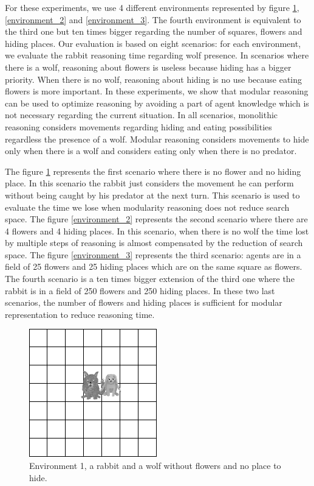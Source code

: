 \documentclass{aamas2012}
\begin{document}
	For these experiments, we use 4 different environments represented by figure \ref{environment_1}, \ref{environment_2} and \ref{environment_3}.
	The fourth environment is equivalent to the third one but ten times bigger regarding the number of squares, flowers and hiding places.
	Our evaluation is based on eight scenarios: for each environment, we evaluate the rabbit reasoning time regarding wolf presence.
	In scenarios where there is a wolf, reasoning about flowers is useless because hiding has a bigger priority.
	When there is no wolf, reasoning about hiding is no use because eating flowers is more important.
	In these experiments, we show that modular reasoning can be used to optimize reasoning by avoiding a part of agent knowledge which 
	is not necessary regarding the current situation.
	In all scenarios, monolithic reasoning considers movements regarding hiding and eating possibilities regardless the presence of a wolf.
	Modular reasoning considers movements to hide only when there is a wolf and considers eating only when there is no predator.
	
	The figure \ref{environment_1} represents the first scenario where there is no flower and no hiding place.
	In this scenario the rabbit just considers the movement he can perform without being caught by his predator at the next turn.
	This scenario is used to evaluate the time we lose when modularity reasoning does not reduce search space.
	The figure \ref{environment_2} represents the second scenario where there are 4 flowers and 4 hiding places.
	In this scenario, when there is no wolf the time lost by multiple steps of reasoning is almost compensated by the reduction of search space.
	The figure \ref{environment_3} represents the third scenario: agents are in a field of 25 flowers and 25 hiding places which are on the same square as flowers.
	The fourth scenario is a ten times bigger extension of the third one where the rabbit is in a field of 250 flowers and 250 hiding places. 
	In these two last scenarios, the number of flowers and hiding places is sufficient for modular representation to reduce reasoning time.
	
	\begin{figure}
		\centering
		\includegraphics[keepaspectratio=true, scale=0.5]{environment_1.png}
		\caption
		{
			\label{environment_1}
			Environment 1, a rabbit and a wolf without flowers and no place to hide.
		}
	\end{figure}
\end{document}
